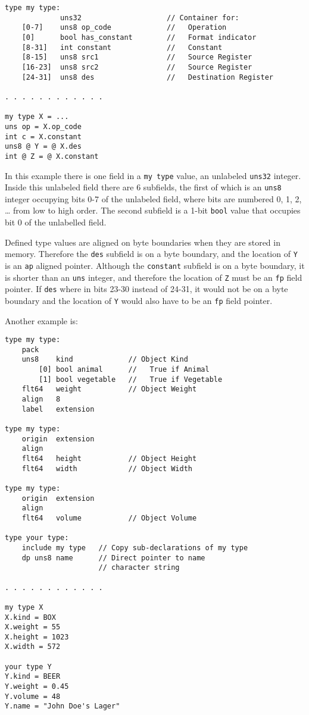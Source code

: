 \documentclass[12pt]{article}
\newenvironment{indpar}[1][0.3in]%
	{\begin{list}{}%
		     {\setlength{\itemsep}{0in}%
		      \setlength{\topsep}{0in}%
		      \setlength{\parsep}{1ex}%
		      \setlength{\labelwidth}{#1}%
		      \setlength{\leftmargin}{#1}%
		      \addtolength{\leftmargin}{\labelsep}}%
	 \item}%
	{\end{list}}
\begin{document}
\begin{indpar}\begin{verbatim}
type my type:
             uns32                    // Container for:
    [0-7]    uns8 op_code             //   Operation
    [0]      bool has_constant        //   Format indicator
    [8-31]   int constant             //   Constant
    [8-15]   uns8 src1                //   Source Register
    [16-23]  uns8 src2                //   Source Register
    [24-31]  uns8 des                 //   Destination Register

. . . . . . . . . . . .

my type X = ...
uns op = X.op_code
int c = X.constant
uns8 @ Y = @ X.des
int @ Z = @ X.constant
\end{verbatim}\end{indpar}

In this example there is one field in a {\tt my type} value,
an unlabeled {\tt uns32} integer.
Inside this unlabeled field there are 6 subfields, the first of which is
an {\tt uns8} integer occupying bits 0-7 of the unlabeled field,
where bits are numbered 0, 1, 2, \ldots{} from
low to high order.  The second subfield is a 1-bit {\tt bool}
value that occupies bit 0 of the unlabelled field.

Defined type values are aligned on byte boundaries when
they are stored in memory.  Therefore the {\tt des} subfield
is on a byte boundary, and
the location of {\tt Y} is an {\tt ap} aligned pointer.  Although
the {\tt constant} subfield is on a byte boundary, it is
shorter than an {\tt uns} integer, and therefore the
location of {\tt Z} must be an {\tt fp} field pointer.
If {\tt des} where in bits 23-30 instead of 24-31, it would
not be on a byte boundary and the location of {\tt Y} would
also have to be an {\tt fp} field pointer.

Another example is:

\begin{indpar}\begin{verbatim}
type my type:
    pack
    uns8    kind             // Object Kind
        [0] bool animal      //   True if Animal
        [1] bool vegetable   //   True if Vegetable
    flt64   weight           // Object Weight
    align   8
    label   extension

type my type:
    origin  extension
    align
    flt64   height           // Object Height
    flt64   width            // Object Width

type my type:
    origin  extension
    align
    flt64   volume           // Object Volume

type your type:
    include my type   // Copy sub-declarations of my type
    dp uns8 name      // Direct pointer to name
                      // character string

. . . . . . . . . . . .

my type X
X.kind = BOX
X.weight = 55
X.height = 1023
X.width = 572

your type Y
Y.kind = BEER
Y.weight = 0.45
Y.volume = 48
Y.name = "John Doe's Lager"
\end{verbatim}\end{indpar}
\end{document}
